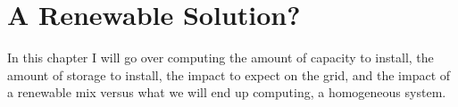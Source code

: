 \setchapterpreamble[u]{\margintoc}
\chapter{A Renewable Solution?}

In this chapter I will go over computing the amount of capacity to install, the amount of storage to install, the impact to expect on the grid, and the impact of a renewable mix versus what we will end up computing, a homogeneous system.